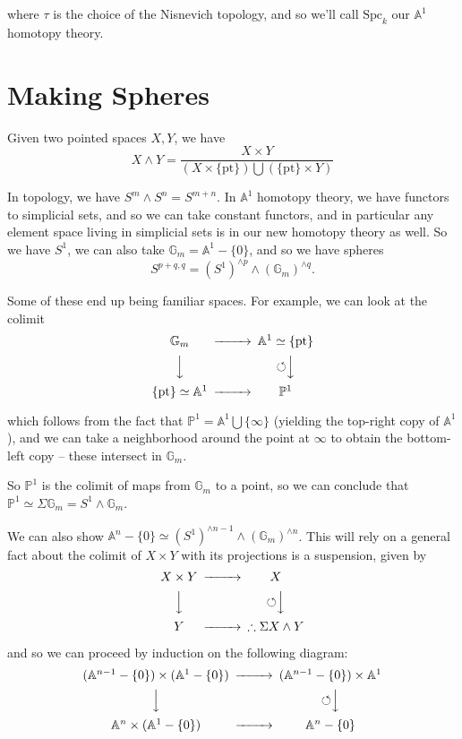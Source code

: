 \documentclass[11pt]{scrreprt}
\theoremstyle{definition}
\newcommand{\PP}[0]{{\mathbb{P}}}
\newcommand{\Af}[0]{{\mathbb{A}}}
\newcommand{\theset}[1]{\{{#1}\}}
\newcommand{\union}[0]{\bigcup}
\newcommand{\pt}[0]{\{\text{pt}\}}
\newcommand{\selfmap}[0]{{\circlearrowleft}}
\newcommand{\GG}[0]{{\mathbb{G}}}
\newcommand{\homotopic}[0]{\simeq}
\newcommand{\cross}[0]{\times}
\begin{document}
where \(\tau\) is the choice of the Nisnevich topology, and so we'll
call \(\text{Spc}_k\) our \(\Af^1\) homotopy theory.

\hypertarget{making-spheres}{%
\section{Making Spheres}\label{making-spheres}}

Given two pointed spaces \(X, Y\), we have \[
X \wedge Y = \frac{X \cross Y}{(X\cross \pt) \union (\pt \cross Y)}
\]

In topology, we have \(S^m \wedge S^n = S^{m+n}\). In \(\Af^1\) homotopy
theory, we have functors to simplicial sets, and so we can take constant
functors, and in particular any element space living in simplicial sets
is in our new homotopy theory as well. So we have \(S^1\), we can also
take \(\GG_m = \Af^1 - \theset{0}\), and so we have spheres \[
S^{p+q,q} = (S^1)^{\wedge p} \wedge (\GG_m)^{\wedge q} .
\]

Some of these end up being familiar spaces. For example, we can look at
the colimit \[
\begin{CD}
  \GG_m @>>> \Af^1 \homotopic \pt \\
  @VVV \selfmap @VVV \\
  \pt \homotopic \Af^1 @>>> \PP^1
\end{CD}
\]

which follows from the fact that
\(\PP^1 = \Af^1 \union \theset{\infty}\) (yielding the top-right copy of
\(\Af^1\)), and we can take a neighborhood around the point at
\(\infty\) to obtain the bottom-left copy -- these intersect in
\(\GG_m\).

So \(\PP^1\) is the colimit of maps from \(\GG_m\) to a point, so we can
conclude that \(\PP^1 \homotopic \Sigma \GG_m = S^1 \wedge \GG_m\).

We can also show
\(\Af^n - \theset{0} \homotopic (S^1)^{\wedge n-1}\wedge (\GG_m)^{\wedge n}\).
This will rely on a general fact about the colimit of \(X\cross Y\) with
its projections is a suspension, given by \[
\begin{CD}
  X\cross Y @>>> X \\
  @VVV \selfmap @VVV \\
  Y @>>> \therefore \Sigma X\wedge Y
\end{CD}
\]

and so we can proceed by induction on the following diagram: \[
\begin{CD}
  (\Af^{n-1} - \theset{0} )\cross(\Af^1 -\theset{0}) @>>> (\Af^{n-1} -\theset{0}) \cross \Af^1 \\
  @VVV \selfmap @VVV \\
  \Af^n \cross (\Af^1 -\theset{0}) @>>> \Af^n - \theset{0}
\end{CD}
\]
\end{document}
